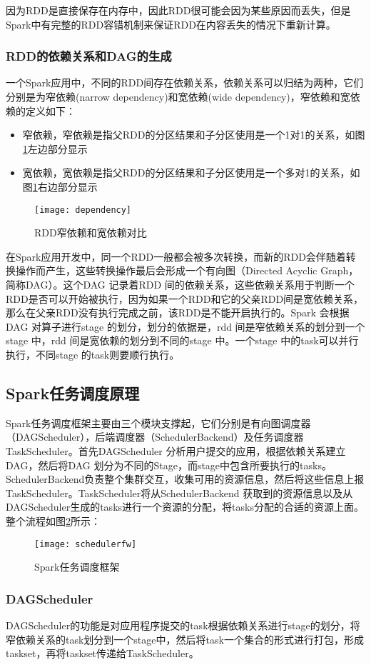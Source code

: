因为RDD是直接保存在内存中，因此RDD很可能会因为某些原因而丢失，但是Spark中有完整的RDD容错机制来保证RDD在内容丢失的情况下重新计算。
\subsubsection{RDD的依赖关系和DAG的生成}
一个Spark应用中，不同的RDD间存在依赖关系，依赖关系可以归结为两种，它们分别是为窄依赖(narrow dependency)和宽依赖(wide dependency)，窄依赖和宽依赖的定义如下：
\begin{itemize}
\item 窄依赖，窄依赖是指父RDD的分区结果和子分区使用是一个1对1的关系，如图\ref{fig:dependency}左边部分显示
\item 宽依赖，宽依赖是指父RDD的分区结果和子分区使用是一个多对1的关系，如图\ref{fig:dependency}右边部分显示
\end{itemize}
\begin{figure}[htp]
\centering
\texttt{[image: dependency]}
\caption{RDD窄依赖和宽依赖对比}
\label{fig:dependency}
\end{figure}
在Spark应用开发中，同一个RDD一般都会被多次转换，而新的RDD会伴随着转换操作而产生，这些转换操作最后会形成一个有向图（Directed Acyclic Graph，简称DAG）。这个DAG 记录着RDD 间的依赖关系，这些依赖关系用于判断一个RDD是否可以开始被执行，因为如果一个RDD和它的父亲RDD间是宽依赖关系，那么在父亲RDD没有执行完成之前，该RDD是不能开启执行的。Spark 会根据DAG 对算子进行stage 的划分，划分的依据是，rdd 间是窄依赖关系的划分到一个stage 中，rdd 间是宽依赖的划分到不同的stage 中。一个stage 中的task可以并行执行，不同stage 的task则要顺行执行。
\subsection{Spark任务调度原理}
Spark任务调度框架主要由三个模块支撑起，它们分别是有向图调度器（DAGScheduler），后端调度器（SchedulerBackend）及任务调度器TaskScheduler。首先DAGScheduler 分析用户提交的应用，根据依赖关系建立DAG，然后将DAG 划分为不同的Stage，而stage中包含所要执行的tasks。SchedulerBackend负责整个集群交互，收集可用的资源信息，然后将这些信息上报TaskScheduler。TaskScheduler将从SchedulerBackend 获取到的资源信息以及从DAGScheduler生成的tasks进行一个资源的分配，将tasks分配的合适的资源上面。整个流程如图\ref{fig:schedulerfw}所示：
\begin{figure}[htp]
\centering
\texttt{[image: schedulerfw]}
\caption{Spark任务调度框架}
\label{fig:schedulerfw}
\end{figure}
\subsubsection{DAGScheduler}
DAGScheduler的功能是对应用程序提交的task根据依赖关系进行stage的划分，将窄依赖关系的task划分到一个stage中，然后将task一个集合的形式进行打包，形成taskset，再将taskset传递给TaskScheduler。

